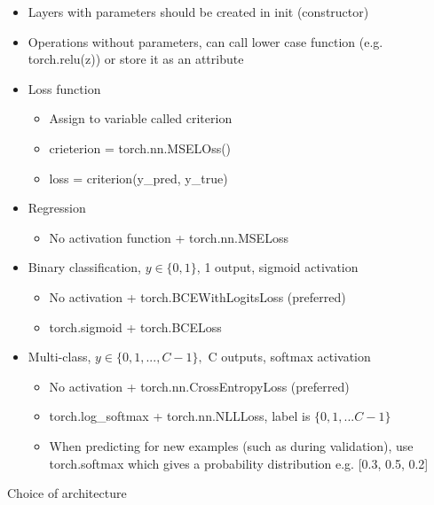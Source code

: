 \documentclass[10pt, oneside]{article}
\begin{document}
\begin{itemize}
    \item Layers with parameters should be created in init (constructor)
    \item Operations without parameters, can call lower case function (e.g. torch.relu(z)) or store it as an attribute
    \item Loss function
    \begin{itemize}
        \item Assign to variable called criterion
        \item crieterion = torch.nn.MSELOss()
        \item loss = criterion(y\_pred, y\_true)
    \end{itemize}
    \item Regression
    \begin{itemize}
        \item No activation function + torch.nn.MSELoss
    \end{itemize}
    \item Binary classification, $y\in \{0,1\}$, 1 output, sigmoid activation
    \begin{itemize}
        \item No activation + torch.BCEWithLogitsLoss (preferred)
        \item torch.sigmoid + torch.BCELoss
    \end{itemize}
    \item Multi-class, $y\in \{0,1,...,C-1\},$ C outputs, softmax activation
    \begin{itemize}
        \item No activation + torch.nn.CrossEntropyLoss (preferred)
        \item torch.log\_softmax + torch.nn.NLLLoss, label is $\{0,1,...C-1\}$
        \item When predicting for new examples (such as during validation), use torch.softmax which gives a probability distribution e.g. [0.3, 0.5, 0.2]
    \end{itemize}
\end{itemize}
Choice of architecture
\end{document}
